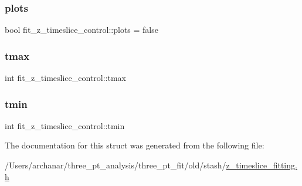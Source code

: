 \mbox{\label{structfit__z__timeslice__control_a2179cb43f27d92144755e397003ec28d}} 
\subsubsection{\texorpdfstring{plots}{plots}}
{\footnotesize\ttfamily bool fit\+\_\+z\+\_\+timeslice\+\_\+control\+::plots = false}

\mbox{\label{structfit__z__timeslice__control_aadf740b8dfbe28be6c86f6e129dc5153}} 
\subsubsection{\texorpdfstring{tmax}{tmax}}
{\footnotesize\ttfamily int fit\+\_\+z\+\_\+timeslice\+\_\+control\+::tmax}

\mbox{\label{structfit__z__timeslice__control_af280756dc4272664033003b4eb1e2d8e}} 
\subsubsection{\texorpdfstring{tmin}{tmin}}
{\footnotesize\ttfamily int fit\+\_\+z\+\_\+timeslice\+\_\+control\+::tmin}



The documentation for this struct was generated from the following file\+:\begin{DoxyCompactItemize}
\item 
/\+Users/archanar/three\+\_\+pt\+\_\+analysis/three\+\_\+pt\+\_\+fit/old/stash/\mbox{\hyperlink{old_2stash_2z__timeslice__fitting_8h}{z\+\_\+timeslice\+\_\+fitting.\+h}}\end{DoxyCompactItemize}
